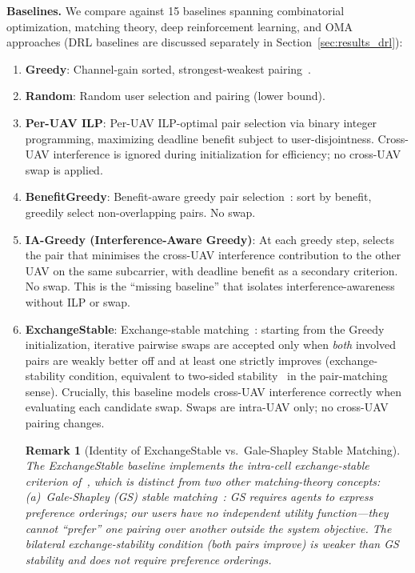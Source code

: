\documentclass[journal]{IEEEtran}
\newtheorem{remark}{Remark}
\begin{document}
\textbf{Baselines.}
We compare against 15 baselines spanning combinatorial optimization, matching theory, deep reinforcement learning, and OMA approaches (DRL baselines are discussed separately in Section~\ref{sec:results_drl}):
\begin{enumerate}
    \item \textbf{Greedy}: Channel-gain sorted, strongest-weakest pairing~\cite{ali2016dynamic}.
    \item \textbf{Random}: Random user selection and pairing (lower bound).
    \item \textbf{Per-UAV ILP}: Per-UAV ILP-optimal pair selection via binary integer programming, maximizing deadline benefit subject to user-disjointness. Cross-UAV interference is ignored during initialization for efficiency; no cross-UAV swap is applied.
    \item \textbf{BenefitGreedy}: Benefit-aware greedy pair selection~\cite{nguyen2024qos}: sort by benefit, greedily select non-overlapping pairs. No swap.
    \item \textbf{IA-Greedy (Interference-Aware Greedy)}: At each greedy step, selects the pair that minimises the cross-UAV interference contribution to the other UAV on the same subcarrier, with deadline benefit as a secondary criterion. No swap. This is the ``missing baseline'' that isolates interference-awareness without ILP or swap.
    \item \textbf{ExchangeStable}: Exchange-stable matching~\cite{altin2022hybrid}: starting from the Greedy initialization, iterative pairwise swaps are accepted only when \emph{both} involved pairs are weakly better off and at least one strictly improves (exchange-stability condition, equivalent to two-sided stability~\cite{hamidouche2017matching} in the pair-matching sense). Crucially, this baseline models cross-UAV interference correctly when evaluating each candidate swap. Swaps are intra-UAV only; no cross-UAV pairing changes.
\begin{remark}[Identity of ExchangeStable vs.\ Gale-Shapley Stable Matching]
\label{rem:exchstable_identity}
The ExchangeStable baseline implements the intra-cell \emph{exchange-stable} criterion of~\cite{altin2022hybrid,di2017sub}, which is distinct from two other matching-theory concepts:
(a)~\emph{Gale-Shapley (GS) stable matching}~\cite{hamidouche2017matching}: GS requires agents to express preference orderings; our users have no independent utility function---they cannot ``prefer'' one pairing over another outside the system objective. The bilateral exchange-stability condition (both pairs improve) is weaker than GS stability and does not require preference orderings.

\end{remark}
\end{enumerate}
\end{document}
